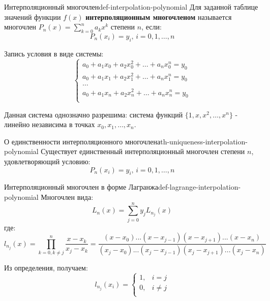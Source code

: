 \documentclass[14pt]{extarticle}
\begin{document}
    \begin{definition}{Интерполяционный многочлен}{def-interpolation-polynomial}
        Для заданной таблице значений функции $f(x)$ \textbf{интерполяционным многочленом} называется многочлен $P_{n}(x) = \sum_{k=0}^{n} a_{k}x^{k}$ степени $n$, если:
        $$P_{n}(x_{i}) = y_{i} \text{, } i = 0, 1, \ldots, n$$
    
        Запись условия в виде системы:
        $$
        \begin{cases}
            a_{0} + a_{1}x_{0} + a_{2}x_{0}^{2} + \ldots + a_{n}x_{0}^{n} = y_{0}\\ 
            a_{0} + a_{1}x_{1} + a_{2}x_{1}^{2} + \ldots + a_{n}x_{1}^{n} = y_{0}\\ 
            \ldots\\
            a_{0} + a_{1}x_{n} + a_{2}x_{n}^{2} + \ldots + a_{n}x_{n}^{n} = y_{0}\\ 
        \end{cases}
        $$

        Данная система однозначно разрешима: система функций $\{1, x, x^{2}, \ldots, x^{n}\}$ - линейно независима в точках $x_{0}, x_{1}, \ldots, x_{n}$.
    \end{definition}

    \begin{theorem}{О единственности интерполяционного многочлена}{th-uniqueness-interpolation-polynomial}
        Существует единственный интерполяционный многочлен степени $n$, удовлетворяющий условию:
        $$P_{n}(x_{i}) = y_{i} \text{, } i = 0, 1, \ldots, n$$
    \end{theorem}

    \begin{definition}{Интерполяционный многочлен в форме Лагранжа}{def-lagrange-interpolation-polynomial}
        Многочлен вида:
        $$L_{n}(x) = \sum_{j = 0}^{n} y_{j}L_{n_{j}}(x)$$
        где:
        $$l_{n_{j}}(x) = \prod_{k = 0, k \neq j}^{n} \frac{x - x_{k}}{x_{j} - x_{k}} = \frac{(x - x_{0}) ... (x - x_{j-1})(x-x_{j+1}) ... (x - x_{n})}{(x_{j} - x_{0}) ... (x_{j} - x_{j - 1})(x_{j} - x_{j + 1}) ... (x_{j} - x_{n})}$$
    
        Из определения, получаем:
        $$
        l_{n_{j}}(x_{i}) = \begin{cases}
            1, & i = j\\
            0, & i \neq j\\
        \end{cases}
        $$
    \end{definition}
\end{document}
